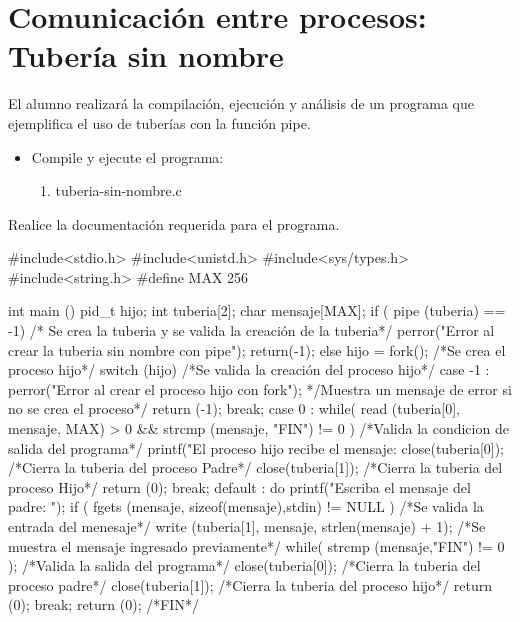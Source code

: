 \section{Comunicación entre procesos: Tubería sin nombre}

	El alumno realizará la compilación, ejecución y análisis de un programa que ejemplifica el uso de tuberías con la función pipe.

\begin{itemize}

	\item Compile y ejecute el programa:

		\begin{enumerate}

			\item tuberia-sin-nombre.c

		\end{enumerate}

\end{itemize}

	Realice la documentación requerida para el programa.
	
#include<stdio.h>
#include<unistd.h>
#include<sys/types.h>
#include<string.h>
#define MAX 256

int main () {	
pid_t hijo;
int tuberia[2];
char mensaje[MAX];
if ( pipe (tuberia) == -1) {	/* Se crea la tuberia y se valida la creación de la tuberia*/
perror("Error al crear la tuberia sin nombre con pipe");		
return(-1);
}
else {
hijo = fork();			/*Se crea el proceso hijo*/
switch (hijo) {			/*Se valida la creación del proceso hijo*/
case -1 :				
perror("Error al crear el proceso hijo con fork");  */Muestra un mensaje de error si no se crea el proceso*/		
return (-1);			
break;			
case 0 :				
while( read (tuberia[0], mensaje, MAX) > 0 && strcmp (mensaje, "FIN\n") != 0 )
	/*Valida la condicion de salida del programa*/				
printf("\n El proceso hijo recibe el mensaje: %
close(tuberia[0]);		/*Cierra la tuberia del proceso Padre*/	
close(tuberia[1]);		/*Cierra la tuberia del proceso Hijo*/	
return (0);			
break;	
default :				
do{					
printf("\n Escriba el mensaje del padre: ");					
if ( fgets (mensaje, sizeof(mensaje),stdin) != NULL )	/*Se valida la entrada del menesaje*/			
write (tuberia[1], mensaje, strlen(mensaje) + 1);	/*Se muestra el mensaje ingresado previamente*/		
}
while( strcmp (mensaje,"FIN\n") != 0 );			/*Valida la salida del programa*/
close(tuberia[0]);						/*Cierra la tuberia del proceso padre*/
close(tuberia[1]);						/*Cierra la tuberia del proceso hijo*/
return (0);			
break;	
}
}
return (0);
}						/*FIN*/